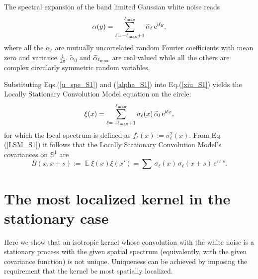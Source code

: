 \documentclass[12pt]{article}
\DeclareMathOperator{\Ex}{\mathbb{E}}
\renewcommand{\S}{{\mathbb S}}
\newcommand{\e}{\mathrm{e}}
\renewcommand{\i}{\mathsf{i}}
\begin{document}
The spectral expansion of the
band limited Gaussian white noise reads
%
\begin {equation}
\label{alpha_S1}
\alpha(y) = \sum_{\ell=-\ell_{\rm max}+1}^{\ell_{\rm max}}  \widetilde\alpha_{\ell}  \, \e^{\i \ell y},
\end {equation}
%
where all the $\widetilde\alpha_\ell$ are mutually uncorrelated
random Fourier coefficients with  mean zero and variance $\frac{1}{2\pi}$.
$\widetilde\alpha_0$ and $\widetilde\alpha_{\ell_{\rm max}}$
are real valued while all the others are complex circularly symmetric
random variables. 

Substituting Eqs.(\ref{u_spe_S1}) and (\ref{alpha_S1}) into Eq.(\ref{xiu_S1}) yields the Locally Stationary Convolution Model 
equation on the circle:
%
\begin {equation}
\label{LSM_S1}
\xi (x) =  \sum_{\ell=-\ell_{\rm max}+1}^{\ell_{\rm max}}  \sigma_\ell(x)  
                          \,\widetilde\alpha_{l} \, \e^{\i \ell x},
\end {equation}
%
for which the  local spectrum is defined as $f_\ell(x) := \sigma_\ell^2(x)$.
From Eq.(\ref{LSM_S1}) it follows that
the Locally Stationary Convolution Model's covariances on $\S^1$ are
%
\begin {equation}
\label{BxxS1}
B(x,x+s) := \Ex \xi (x) \xi (x') = \sum
                          \,\sigma_\ell(x) \, \sigma_\ell(x+s)\, \e^{\i \ell s}.
\end {equation}
%




\section{The most localized kernel in the stationary case}
\label{App_kernel_lcz}



Here we show that an isotropic kernel whose convolution with the white noise 
is a stationary process with the given spatial spectrum (equivalently,
with the given covariance function) is not unique. Uniqueness can be achieved by 
imposing the requirement that the kernel be most spatially localized.
\end{document}

